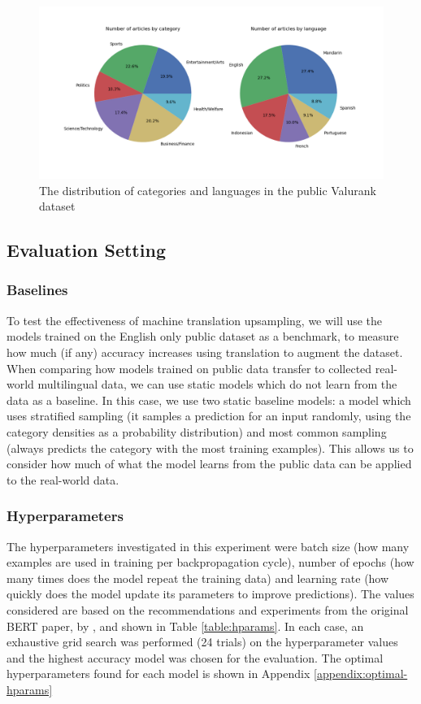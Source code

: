 \documentclass{l4proj}
\begin{document}
\begin{figure}[h]
\includegraphics[width=\textwidth]{images/real_data_distributions.png}
\caption{The distribution of categories and languages in the public Valurank dataset}
\label{fig:collected-distributions}
\end{figure}

\subsection{Evaluation Setting}
\subsubsection{Baselines} \hfill \par
To test the effectiveness of machine translation upsampling, we will use the models trained on the English only public dataset as a benchmark, to measure how much (if any) accuracy increases using translation to augment the dataset. When comparing how models trained on public data transfer to collected real-world multilingual data, we can use static models which do not learn from the data as a baseline. In this case, we use two static baseline models: a model which uses stratified sampling (it samples a prediction for an input randomly, using the category densities as a probability distribution) and most common sampling (always predicts the category with the most training examples). This allows us to consider how much of what the model learns from the public data can be applied to the real-world data.

\subsubsection{Hyperparameters} \hfill \par
The hyperparameters investigated in this experiment were batch size (how many examples are used in training per backpropagation cycle), number of epochs (how many times does the model repeat the training data) and learning rate (how quickly does the model update its parameters to improve predictions). The values considered are based on the recommendations and experiments from the original BERT paper, by \cite{devlin2018bert}, and shown in Table \ref{table:hparams}. In each case, an exhaustive grid search was performed (24 trials) on the hyperparameter values and the highest accuracy model was chosen for the evaluation. The optimal hyperparameters found for each model is shown in Appendix \ref{appendix:optimal-hparams}
\end{document}
